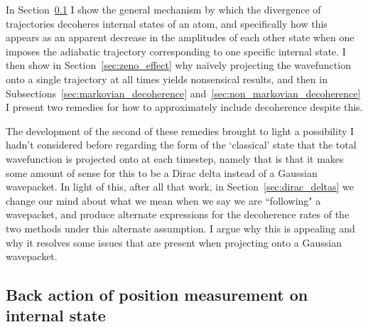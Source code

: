 In Section~\ref{sec:backaction} I show the general mechanism by which the divergence of trajectories decoheres internal states of an atom, and specifically how this appears as an apparent decrease in the amplitudes of each other state when one imposes the adiabatic trajectory corresponding to one specific internal state. I then show in Section~\ref{sec:zeno_effect} why na\"ively projecting the wavefunction onto a single trajectory at all times yields nonsensical results, and then in Subsections~\ref{sec:markovian_decoherence} and~\ref{sec:non_markovian_decoherence} I present two remedies for how to approximately include decoherence despite this. 

The development of the second of these remedies brought to light a possibility I hadn't considered before regarding the form of the `classical' state that the total wavefunction is projected onto at each timestep, namely that is that it makes some amount of sense for this to be a Dirac delta instead of a Gaussian wavepacket. In light of this, after all that work, in Section~\ref{sec:dirac_deltas} we change our mind about what we mean when we say we are ``following" a wavepacket, and produce alternate expressions for the decoherence rates of the two methods under this alternate assumption. I argue why this is appealing and why it resolves some issues that are present when projecting onto a Gaussian wavepacket.

\subsection{Back action of position measurement on internal state}\label{sec:backaction}

